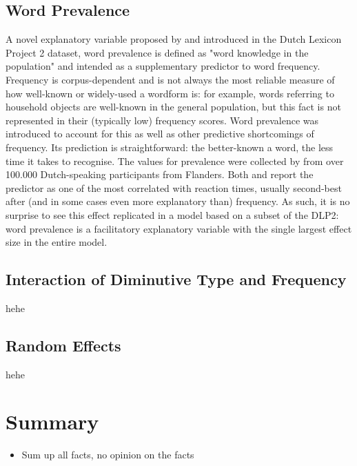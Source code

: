 \subsection{Word Prevalence} \label{subsec:prevalence}
A novel explanatory variable proposed by \cite{Keuleers+etal+2015} and introduced in the Dutch Lexicon Project 2 dataset, word prevalence is defined as "word knowledge in the population" \parencite{Brysbaert+etal+2016} and intended as a supplementary predictor to word frequency. Frequency is corpus-dependent and is not always the most reliable measure of how well-known or widely-used a wordform is: for example, words referring to household objects are well-known in the general population, but this fact is not represented in their (typically low) frequency scores. Word prevalence was introduced to account for this as well as other predictive shortcomings of frequency. Its prediction is straightforward: the better-known a word, the less time it takes to recognise. The values for prevalence were collected by \cite{Keuleers+etal+2015} from over 100.000 Dutch-speaking participants from Flanders. Both \cite{Keuleers+etal+2015} and \cite{Brysbaert+etal+2016} report the predictor as one of the most correlated with reaction times, usually second-best after (and in some cases even more explanatory than) frequency. As such, it is no surprise to see this effect replicated in a model based on a subset of the DLP2: word prevalence is a facilitatory explanatory variable with the single largest effect size in the entire model.
\subsection{Interaction of Diminutive Type and Frequency} \label{subsec:interaction}
hehe
\subsection{Random Effects}
hehe

\section{Summary} \label{sec:stats_summary}
\begin{itemize}
\item Sum up all facts, no opinion on the facts
\end{itemize}
